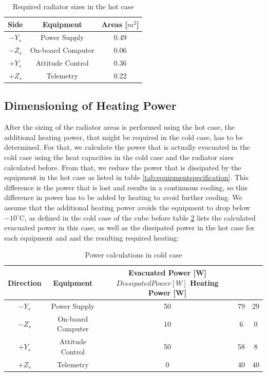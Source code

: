 \begin{table}[H]
\centering
\begin{tabular}{ | c| c| c| }
\hline 
Side & Equipment  & Areas [$m^{2}$] \\ \hline
$-Y_{s}$ & Power Supply & 0.49   \\ \hline
$-Z_{s}$ &On-board Computer & 0.06   \\\hline
$+Y_{s}$ &Attitude Control &  0.36 \\ \hline
$+Z_{s}$ &Telemetry  &    0.22 \\ \hline
\end{tabular}
\caption{Required radiator sizes in the hot case}
\label{tab:arrangement}
\end{table}

 
\subsection{Dimensioning of Heating Power}
After the sizing of the radiator areas is performed using the hot case, the additional heating power, that might be required in the cold case, has to be determined. For that, we calculate the power that is actually evacuated in the cold case using the heat capacities in the cold case and the radiator sizes calculated before. From that, we reduce the power that is dissipated by the equipment in the hot case as listed in table \ref{tab:equipmentspecification}. This difference is the power that is lost and results in a continuous cooling, so this difference in power has to be added by heating to avoid further cooling. We assume that the additional heating power avoids the equipment to drop below $-10^{\circ}$C, as defined in the cold case of the cube before table \ref{tab:powerlisted} lists the calculated evacuated power in this case, as well as the dissipated power in the hot case for each equipment and and the resulting required heating:

\begin{table}[H]
\centering
\begin{tabular}{ | c| c| c| c|c|}
\hline 
Direction& Equipment  & Evacuated Power [W] $ Dissipated Power [W] $ Heating Power [W] \\ \hline
$-Y_{s}$ & Power Supply &  50 & 79 & 29    \\ \hline
$-Z_{s}$ &On-board Computer &10 &6 &  0  \\\hline
$+Y_{s}$ &Attitude Control & 50 & 58 & 8  \\ \hline
$+Z_{s}$ &Telemetry  &  0   & 40 & 40 \\ \hline
\end{tabular}
\caption{Power calculations in cold case}
\label{tab:powerlisted}
\end{table}

